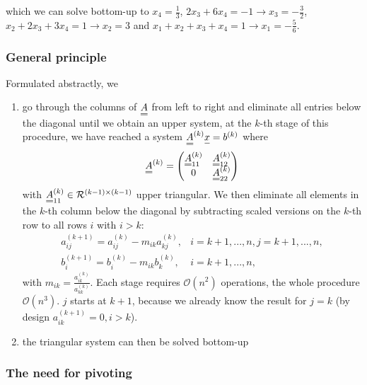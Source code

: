 which we can solve bottom-up to $x_4 = \frac{1}{3}$, $2x_3 + 6x_4 = -1 \rightarrow x_3 = -\frac{3}{2}$,
$x_2 + 2x_3 + 3x_4 = 1 \rightarrow x_2 = 3$ and $x_1 + x_2 + x_3 + x_4 = 1 \rightarrow x_1 = -\frac{5}{6}$.

\subsubsection{General principle}

Formulated abstractly, we

\begin{enumerate}
    \item go through the columns of $\mat{A}$ from left to 
    right and eliminate all entries below the diagonal until we obtain an upper 
    system, at the $k$-th stage of this procedure, we have reached a system $\mat{A}^{(k)}\vec{x} = b^{(k)}$
    where
    \begin{equation}
        \mat{A}^{(k)} = \begin{pmatrix}
            \mat{A}_{11}^{(k)} & \mat{A}_{12}^{(k)} \\
            0 & \mat{A}_{22}^{(k)}
        \end{pmatrix}
    \end{equation}
    with $\mat{A}_{11}^{(k)} \in \mathcal{R}^{(k-1) \times (k-1)}$ upper triangular. We then eliminate
    all elements in the $k$-th column below the diagonal by subtracting scaled versions on the $k$-th row
    to all rows $i$ with $i>k$:
    \begin{equation}
        \begin{array}{ll}
            a_{i j}^{(k+1)}=a_{i j}^{(k)}-m_{i k} a_{k j}^{(k)}, & i=k+1, ..., n, j=k+1, ..., n, \\
            b_i^{(k+1)}=b_i^{(k)}-m_{i k} b_k^{(k)}, & i=k+1, ..., n,
        \end{array}
    \end{equation}
    with $m_{ik} = \frac{a^{(k)}_{ik}}{a^{(k)}_{kk}}$. Each stage requires $\mathcal{O}(n^2)$ operations, the whole procedure $\mathcal{O}(n^3)$.
    $j$ starts at $k+1$, because we already know the result for $j=k$ (by design $a_{ik}^{(k+1)} = 0,i>k$).
    \item the triangular system can then be solved bottom-up
\end{enumerate}

\subsubsection{The need for pivoting}

